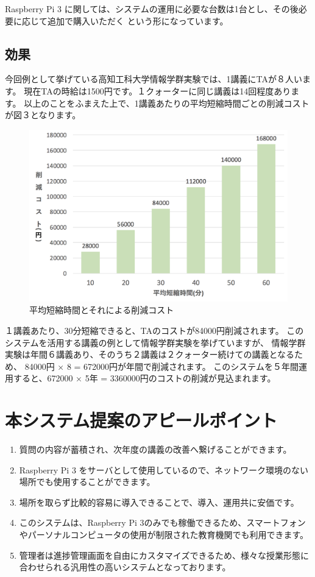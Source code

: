 \documentclass[a4j,titlepage]{ujarticle}
\begin{document}
Raspberry Pi 3 に関しては、システムの運用に必要な台数は1台とし、その後必要に応じて追加で購入いただく
という形になっています。

\subsection{効果}
今回例として挙げている高知工科大学情報学群実験では、1講義にTAが８人います。
現在TAの時給は1500円です。１クォーターに同じ講義は14回程度あります。
以上のことをふまえた上で、1講義あたりの平均短縮時間ごとの削減コストが図３となります。
\begin{figure}[h]

\centering
   \includegraphics[width=13cm]{sisan.png}
  \caption{平均短縮時間とそれによる削減コスト}
\end{figure}


１講義あたり、30分短縮できると、TAのコストが84000円削減されます。
このシステムを活用する講義の例として情報学群実験を挙げていますが、
情報学群実験は年間６講義あり、そのうち２講義は２クォーター続けての講義となるため、 84000円 × 8 = 672000円が年間で削減されます。
このシステムを５年間運用すると、672000 × 5年 = 3360000円のコストの削減が見込まれます。

\section{本システム提案のアピールポイント}
\begin{enumerate}[(1)]
\item 質問の内容が蓄積され、次年度の講義の改善へ繋げることができます。

\item Raspberry Pi 3 をサーバとして使用しているので、ネットワーク環境のない場所でも使用することができます。

\item 場所を取らず比較的容易に導入できることで、導入、運用共に安価です。

\item このシステムは、Raspberry Pi 3のみでも稼働できるため、スマートフォンやパーソナルコンピュータの使用が制限された教育機関でも利用できます。

\item 管理者は進捗管理画面を自由にカスタマイズできるため、様々な授業形態に合わせられる汎用性の高いシステムとなっております。
\end{enumerate}
\end{document}
